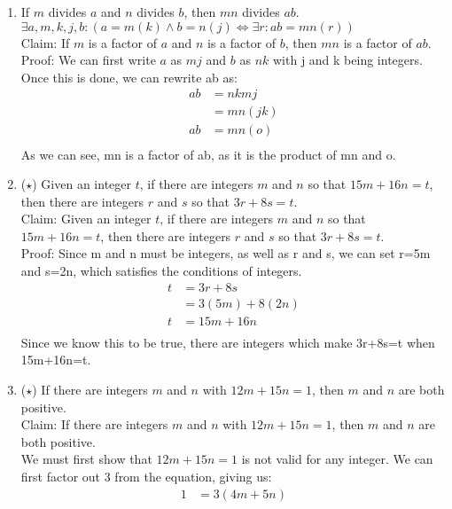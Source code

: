 \documentclass{letter}
\theoremstyle{definition}
\begin{document}
\begin{description}
\begin{enumerate}
		\item If $m$ divides $a$ and $n$ divides $b$, then $mn$ divides $ab$. \\
$ \exists a,m,k,j,b: (a=m(k) \wedge b=n(j) \Leftrightarrow \exists r: ab=mn(r))$ \\
Claim: If $m$ is a factor of $a$ and $n$ is a factor of $b$, then $mn$ is a factor of $ab$.
Proof: We can first write $a$ as $mj$ and $b$ as $nk$ with j and k being integers. Once this is done, we can rewrite ab as: \\
\begin{align*}
ab&=nkmj \\
&=mn(jk) \\
ab &= mn(o) \tag{set jk to o} \\
\end{align*}
As we can see, mn is a factor of ab, as it is the product of mn and o. \\
                \item ($\star$)  Given an integer $t$, if there are integers $m$ and $n$ so that $15m+16n=t$, then there are integers $r$ and $s$ so that $3r+8s=t$. \\
Claim:  Given an integer $t$, if there are integers $m$ and $n$ so that $15m+16n=t$, then there are integers $r$ and $s$ so that $3r+8s=t$. \\
Proof: Since m and n must be integers, as well as r and s, we can set r=5m and s=2n, which satisfies the conditions of integers. \\
\begin{align*}
t &= 3r + 8s \\
&= 3(5m)+8(2n) \tag{plugged in values of r and s} \\
t &= 15m +16n \tag{Solved for the values above} \\
\end{align*}
Since we know this to be true, there are integers which make 3r+8s=t when 15m+16n=t. \\
		\item ($\star$) If there are integers $m$ and $n$ with $12m+15n=1$, then $m$ and $n$ are both positive. \\
Claim: If there are integers $m$ and $n$ with $12m+15n=1$, then $m$ and $n$ are both positive. \\
We must first show that $12m+15n=1$ is not valid for any integer. We can first factor out 3 from the equation, giving us: \\
\begin{align*}
 1 &= 3(4m+5n) \\

\end{align*}
\end{enumerate}
\end{description}
\end{document}
